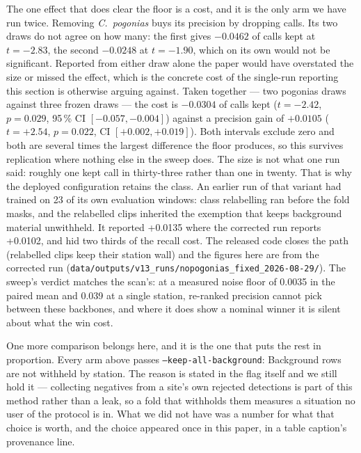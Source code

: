 \documentclass[review,3p,times]{elsarticle}
\begin{document}
The one effect that does clear the floor is a cost, and it is the only arm we
have run twice. Removing \textit{C.\ pogonias} buys its precision by dropping
calls. Its two draws do not agree on how many: the first gives $-0.0462$ of
calls kept at $t = -2.83$, the second $-0.0248$ at $t = -1.90$, which on its
own would not be significant. Reported from either draw alone the paper would
have overstated the size or missed the effect, which is the concrete cost of
the single-run reporting this section is otherwise arguing against. Taken
together --- two pogonias draws against three frozen draws --- the cost is
$-0.0304$ of calls kept ($t = -2.42$, $p = 0.029$, 95\,\% CI
$[-0.057, -0.004]$) against a precision gain of $+0.0105$ ($t = +2.54$,
$p = 0.022$, CI $[+0.002, +0.019]$). Both intervals exclude zero and both are
several times the largest difference the floor produces, so this survives
replication where nothing else in the sweep does. The size is not what one run
said: roughly one kept call in thirty-three rather than one in twenty. That is
why the deployed configuration retains the class. An earlier run of that variant had trained
on 23 of its own evaluation windows: class relabelling ran before the fold
masks, and the relabelled clips inherited the exemption that keeps background
material unwithheld. It reported +0.0135 where the corrected run reports
+0.0102, and hid two thirds of the recall cost. The released code closes the
path (relabelled clips keep their station wall) and the figures here are from
the corrected run
(\texttt{data/outputs/v13\_runs/nopogonias\_fixed\_2026-08-29/}). The
sweep's verdict matches the scan's: at a measured noise floor of 0.0035 in the
paired mean and 0.039 at a single station, re-ranked precision cannot pick
between these backbones, and where it does show a nominal winner it is silent
about what the win cost.

One more comparison belongs here, and it is the one that puts the rest in
proportion. Every arm above passes \texttt{--keep-all-background}: Background
rows are not withheld by station. The reason is stated in the flag itself and we
still hold it --- collecting negatives from a site's own rejected detections is
part of this method rather than a leak, so a fold that withholds them measures a
situation no user of the protocol is in. What we did not have was a number for
what that choice is worth, and the choice appeared once in this paper, in a
table caption's provenance line.
\end{document}
